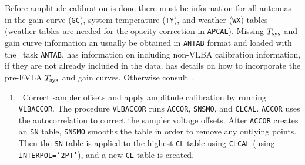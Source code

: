 {Before amplitude calibration is done there must be information
for all antennas in the gain curve ({\tt GC}), system temperature
({\tt TY}), and weather ({\tt WX}) tables (weather tables are needed for
the opacity correction in {\tt APCAL}).  Missing $T_{\rm sys}$ and gain curve
information an usually be obtained in {\tt ANTAB}  format and
loaded with the \AIPS\ task {\tt ANTAB}.  has information on
including non-VLBA calibration information, if they are not already
included in the data.
 has details on how to
incorporate the pre-EVLA  $T_{\rm sys}$ and gain curves.
Otherwise consult
\@.}

\begin{enumerate}

\item\ {Correct sampler offsets and apply amplitude calibration by
running {\tt VLBACCOR}\@.  The procedure {\tt VLBACCOR} runs
{\tt ACCOR}, {\tt SNSMO}, and {\tt CLCAL}. {\tt ACCOR} uses the
autocorrelation to correct the sampler voltage offsets.  After
{\tt ACCOR} creates an {\tt SN} table, {\tt SNSMO} smooths the table
in order to remove any outlying points.  Then the {\tt SN} table is
applied to the highest {\tt CL} table using {\tt CLCAL} (using {\tt
INTERPOL='2PT'}), and a new {\tt CL} table is created.}



\end{enumerate}
